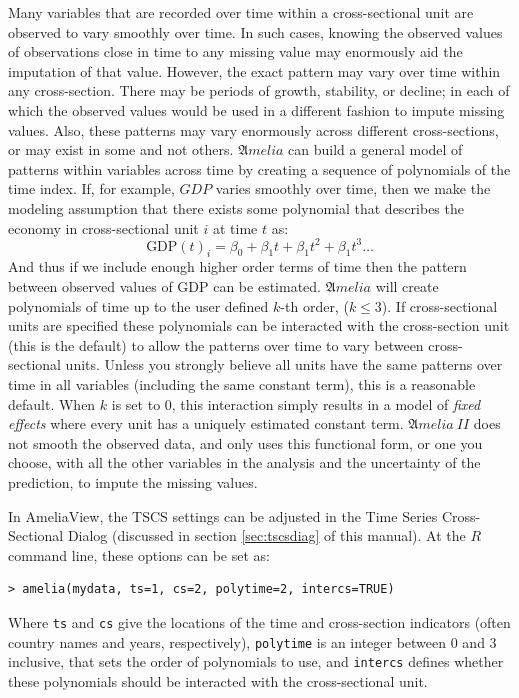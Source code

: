 \documentclass[12pt,titlepage]{article}
\newcommand{\AmeliaII}{\ensuremath{\mathfrak Amelia~II} }
\begin{document}
Many variables that are recorded over time within a cross-sectional
unit are observed to vary smoothly over time.  In such cases, knowing
the observed values of observations close in time to any missing value
may enormously aid the imputation of that value.  However, the exact
pattern may vary over time within any cross-section.  There may be
periods of growth, stability, or decline; in each of which the
observed values would be used in a different fashion to impute missing
values.  Also, these patterns may vary enormously across different
cross-sections, or may exist in some and not others.  ${\mathfrak
  Amelia}$ can build a general model of patterns within variables
across time by creating a sequence of polynomials of the time index.
If, for example, $GDP$ varies smoothly over time, then we make the
modeling assumption that there exists some polynomial that describes
the economy in cross-sectional unit $i$ at time $t$ as:
\begin{equation}
\textrm{GDP}(t)_i = \beta_0 + \beta_1 t + \beta_1 t^2 + \beta_1 t^3 \ldots
\end{equation}
And thus if we include enough higher order terms of time then the
pattern between observed values of GDP can be estimated.  ${\mathfrak
  Amelia}$ will create polynomials of time up to the user defined
$k$-th order, ($k\leq3$).  If cross-sectional units are specified
these polynomials can be interacted with the cross-section unit (this
is the default) to allow the patterns over time to vary between
cross-sectional units.  Unless you strongly believe all units have the
same patterns over time in all variables (including the same constant
term), this is a reasonable default.  When $k$ is set to 0, this
interaction simply results in a model of \emph{fixed effects} where
every unit has a uniquely estimated constant term.  \AmeliaII does not
smooth the observed data, and only uses this functional form, or one
you choose, with all the other variables in the analysis and the
uncertainty of the prediction, to impute the missing values.

In AmeliaView, the TSCS settings can be adjusted in the Time Series
Cross-Sectional Dialog (discussed in section \ref{sec:tscsdiag} of
this manual).  At the $R$ command line, these options can be set as:

\begin{verbatim}
> amelia(mydata, ts=1, cs=2, polytime=2, intercs=TRUE)
\end{verbatim} 

Where \texttt{ts} and \texttt{cs} give the locations of the time and
cross-section indicators (often country names and years,
respectively), \texttt{polytime} is an integer between 0 and 3
inclusive, that sets the order of polynomials to use, and
\texttt{intercs} defines whether these polynomials should be
interacted with the cross-sectional unit.
\end{document}
